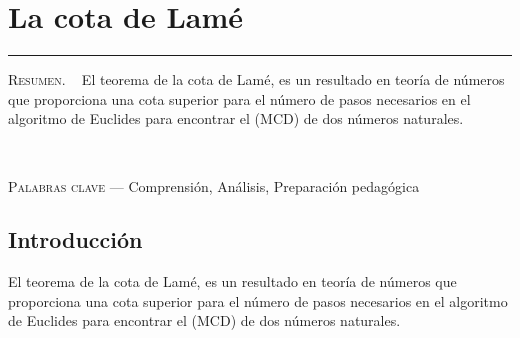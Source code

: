 \thispagestyle{portadapage}
\setcounter{subsection}{0}
\setcounter{subsubsection}{0}
\setcounter{actividad}{0}
\setcounter{actividad_previa}{0}
\setcounter{actividad_entre}{0}
\renewcommand{\articulotipo}{Comunicación breve}
\renewcommand{\articulotitulo}{La cota de Lamé}
\renewcommand{\articulotitulocorto}{La cota de Lamé}
\section{\articulotitulo}

\noindent\rule{\linewidth}{2pt}

\vspace{0.25cm}

\begin{flushright}
\end{flushright}

\vspace{0.5cm}

\begin{center}
	\begin{minipage}{0.75\linewidth} \small
		\textsc{Resumen}. ~
		El teorema de la cota de Lamé, es un resultado en teoría de números que proporciona una cota superior para el número de pasos necesarios en el algoritmo de Euclides para encontrar el (MCD) de dos números naturales.
	\end{minipage}\\
	
	\vspace{0.5em}
	
	\begin{minipage}{0.75\linewidth} \small
	\textsc{Palabras clave} --- Comprensión, Análisis, Preparación pedagógica
	\end{minipage}
\end{center}

\subsection{Introducción}

El teorema de la cota de Lamé, es un resultado en teoría de números que proporciona una cota superior para el número de pasos necesarios en el algoritmo de Euclides para encontrar el (MCD) de dos números naturales.

